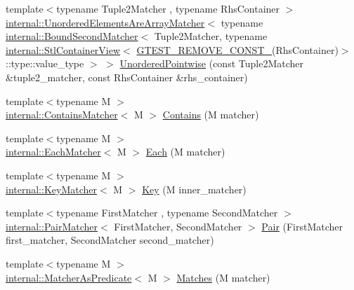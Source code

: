\begin{DoxyCompactItemize}
\item 
{\footnotesize template$<$typename Tuple2\+Matcher , typename Rhs\+Container $>$ }\\\hyperlink{classtesting_1_1internal_1_1UnorderedElementsAreArrayMatcher}{internal\+::\+Unordered\+Elements\+Are\+Array\+Matcher}$<$ typename \hyperlink{classtesting_1_1internal_1_1BoundSecondMatcher}{internal\+::\+Bound\+Second\+Matcher}$<$ Tuple2\+Matcher, typename \hyperlink{classtesting_1_1internal_1_1StlContainerView}{internal\+::\+Stl\+Container\+View}$<$ \hyperlink{gtest-internal_8h_a2ffec8c60510eb130af387f5ce9a756a}{G\+T\+E\+S\+T\+\_\+\+R\+E\+M\+O\+V\+E\+\_\+\+C\+O\+N\+S\+T\+\_\+}(Rhs\+Container)$>$\+::type\+::value\+\_\+type $>$ $>$ \hyperlink{namespacetesting_a3e800c56ae70a6d9955077a75d4971f1}{Unordered\+Pointwise} (const Tuple2\+Matcher \&tuple2\+\_\+matcher, const Rhs\+Container \&rhs\+\_\+container)
\item 
{\footnotesize template$<$typename M $>$ }\\\hyperlink{classtesting_1_1internal_1_1ContainsMatcher}{internal\+::\+Contains\+Matcher}$<$ M $>$ \hyperlink{namespacetesting_a2a12af7db4752797d06c1182b2470933}{Contains} (M matcher)
\item 
{\footnotesize template$<$typename M $>$ }\\\hyperlink{classtesting_1_1internal_1_1EachMatcher}{internal\+::\+Each\+Matcher}$<$ M $>$ \hyperlink{namespacetesting_a42743c985b1e02dc373ab7517ca1e740}{Each} (M matcher)
\item 
{\footnotesize template$<$typename M $>$ }\\\hyperlink{classtesting_1_1internal_1_1KeyMatcher}{internal\+::\+Key\+Matcher}$<$ M $>$ \hyperlink{namespacetesting_a6212e76b542f4ffd3079de59092a826a}{Key} (M inner\+\_\+matcher)
\item 
{\footnotesize template$<$typename First\+Matcher , typename Second\+Matcher $>$ }\\\hyperlink{classtesting_1_1internal_1_1PairMatcher}{internal\+::\+Pair\+Matcher}$<$ First\+Matcher, Second\+Matcher $>$ \hyperlink{namespacetesting_ac7520de8af26d3085513eeeb68561889}{Pair} (First\+Matcher first\+\_\+matcher, Second\+Matcher second\+\_\+matcher)
\item 
{\footnotesize template$<$typename M $>$ }\\\hyperlink{classtesting_1_1internal_1_1MatcherAsPredicate}{internal\+::\+Matcher\+As\+Predicate}$<$ M $>$ \hyperlink{namespacetesting_ad53b509ae9cd51040d67f668f99702ae}{Matches} (M matcher)
\item 

\end{DoxyCompactItemize}
